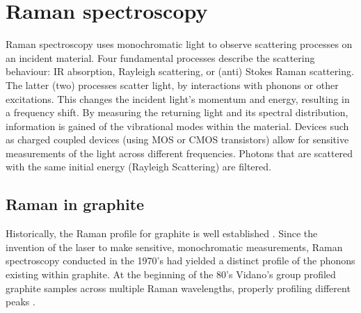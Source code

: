 \documentclass[../Matt_Gebert_Honours_Thesis.tex]{subfiles}
\begin{document}

\section{Raman spectroscopy}

Raman spectroscopy uses monochromatic light to observe scattering processes on an incident material. Four fundamental processes describe the scattering behaviour: IR absorption, Rayleigh scattering, or (anti) Stokes Raman scattering. The latter (two) processes scatter light, by interactions with phonons or other excitations. This changes the incident light's momentum and energy, resulting in a frequency shift. By measuring the returning light and its spectral distribution, information is gained of the vibrational modes within the material. Devices such as charged coupled devices (using MOS or CMOS transistors) allow for sensitive measurements of the light across different frequencies. Photons that are scattered with the same initial energy (Rayleigh Scattering) are filtered.

\subsection{Raman in graphite}
Historically, the Raman profile for graphite is well established \cite{vidano_observation_1981}. Since the invention of the laser to make sensitive, monochromatic measurements, Raman spectroscopy conducted in the 1970's had yielded a distinct profile of the phonons existing within  graphite\cite{nemanich_first-_1979,tuinstra_characterization_1970,tuinstra_raman_1970}. At the beginning of the 80's Vidano's group profiled graphite samples across multiple Raman wavelengths, properly profiling different peaks \cite{vidano_observation_1981}. 
\end{document}
